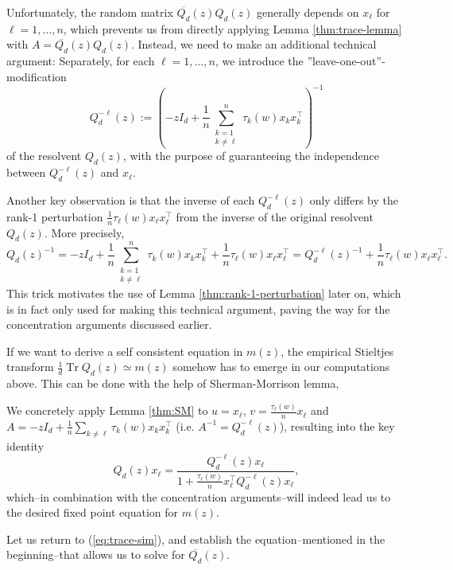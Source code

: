 \documentclass{article}
\begin{document}
\par
Unfortunately, the random matrix $\overline{Q_d}(z)Q_d(z)$ generally depends on $x_\ell$ for $\ell=1,\dots,n$, which prevents us from directly applying Lemma \ref{thm:trace-lemma} with $A=\overline{Q_d}(z)Q_d(z)$. Instead, we need to make an additional technical argument: Separately, for each $\ell=1,\dots,n$, we introduce the ''leave-one-out''-modification
\begin{equation}
Q_d^{-\ell}(z):=\left(-zI_d + \frac{1}{n}\sum_{\substack{k=1 \\ k\neq\ell}}^n\tau_k(w) x_kx_k^\top\right)^{-1}
\end{equation}
of the resolvent $Q_d(z)$, with the purpose of guaranteeing the independence between $Q_d^{-\ell}(z)$ and $x_\ell$. 
\par
Another key observation is that the inverse of each $Q^{-\ell}_d(z)$ only differs by the rank-1 perturbation $\frac{1}{n}\tau_\ell(w) x_\ell x_\ell^\top$ from the inverse of the original resolvent $Q_d(z)$. More precisely,
\begin{equation}
Q_d(z)^{-1} = -zI_d+\frac{1}{n}\sum_{\substack{k=1 \\ k\neq\ell}}^n\tau_k(w) x_kx_k^\top+\frac{1}{n}\tau_\ell(w) x_\ell x_\ell^\top = Q_d^{-\ell}(z)^{-1}+\frac{1}{n}\tau_\ell(w) x_\ell x_\ell^\top.
\end{equation}
This trick motivates the use of Lemma \ref{thm:rank-1-perturbation} later on, which is in fact only used for making this technical argument, paving the way for the concentration arguments discussed earlier.
\bigskip
\par
If we want to derive a self consistent equation in $m(z)$, the empirical Stieltjes transform $\frac{1}{d}\operatorname{Tr}Q_d(z)\simeq m(z)$ somehow has to emerge in our computations above. This can be done with the help of Sherman-Morrison lemma,
\bigskip
\par
We concretely apply Lemma \ref{thm:SM} to $u=x_\ell$, $v=\frac{\tau_\ell(w)}{n}x_\ell$ and $A=-zI_d+\frac{1}{n}\sum\limits_{k\neq\ell}\tau_k(w) x_kx_k^\top$ (i.e. $A^{-1}=Q_d^{-\ell}(z)$), resulting into the key identity
\begin{equation}
Q_d(z)x_\ell = \frac{Q_d^{-\ell}(z)x_\ell}{1+\frac{\tau_\ell(w)}{n}x_\ell^\top Q_d^{-\ell}(z)x_\ell},
\end{equation}
which--in combination with the concentration arguments--will indeed lead us to the desired fixed point equation for $m(z)$.
\bigskip
\par
Let us return to (\ref{eq:trace-sim}), and establish the equation--mentioned in the beginning--that allows us to solve for $\overline{Q_d}(z)$.
\end{document}
